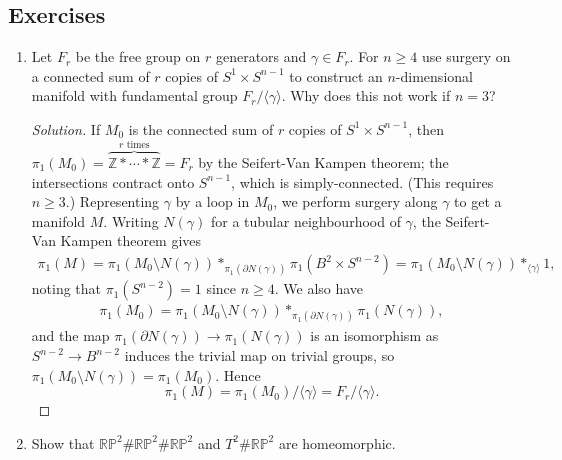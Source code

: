 \documentclass{article}
\theoremstyle{definition}
\newcommand{\RP}{\mathbb{RP}}
\newcommand{\Z}{\mathbb{Z}}
\begin{document}
\subsection*{Exercises}

\begin{enumerate}
    \item Let $F_r$ be the free group on $r$ generators and $\gamma\in F_r$. For
        $n\ge4$ use surgery on a connected sum of $r$ copies of
        $S^1\times S^{n-1}$ to construct an $n$-dimensional manifold with
        fundamental group $F_r/\langle\gamma\rangle$. Why does this not work if
        $n=3$?
        \begin{proof}[Solution]
            If $M_0$ is the connected sum of $r$ copies of $S^1\times S^{n-1}$,
            then $\pi_1(M_0)=\overbrace{\Z*\cdots*\Z}^{\text{$r$ times}}=F_r$ by
            the Seifert-Van Kampen theorem; the intersections contract onto
            $S^{n-1}$, which is simply-connected. (This requires $n\ge3$.)
            Representing $\gamma$ by a loop in $M_0$, we perform surgery along
            $\gamma$ to get a manifold $M$. Writing $N(\gamma)$ for a tubular
            neighbourhood of $\gamma$, the Seifert-Van Kampen theorem gives
            \begin{align*}
                \pi_1(M)
                    = \pi_1(M_0\setminus N(\gamma))
                        *_{\pi_1(\partial N(\gamma))}\pi_1(B^2\times S^{n-2})
                    = \pi_1(M_0\setminus N(\gamma))*_{\langle\gamma\rangle}1,
            \end{align*}
            noting that $\pi_1(S^{n-2})=1$ since $n\ge4$. We also have
            \begin{align*}
                \pi_1(M_0)
                    = \pi_1(M_0\setminus N(\gamma))
                        *_{\pi_1(\partial N(\gamma))}\pi_1(N(\gamma)),
            \end{align*}
            and the map $\pi_1(\partial N(\gamma))\to\pi_1(N(\gamma))$ is an
            isomorphism as $S^{n-2}\to B^{n-2}$ induces the trivial map on
            trivial groups, so $\pi_1(M_0\setminus N(\gamma))=\pi_1(M_0)$. Hence
            \begin{equation*}
                \pi_1(M)
                    = \pi_1(M_0)/\langle\gamma\rangle
                    = F_r/\langle\gamma\rangle.
            \end{equation*}
        \end{proof}

    \item Show that $\RP^2\#\RP^2\#\RP^2$ and $T^2\#\RP^2$ are homeomorphic.


\end{enumerate}
\end{document}
